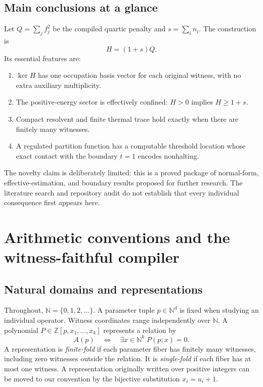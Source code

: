 \documentclass[11pt,letterpaper]{article}
\theoremstyle{definition}
\theoremstyle{remark}
\newcommand{\N}{\mathbb N}
\newcommand{\Z}{\mathbb Z}
\begin{document}
\subsection{Main conclusions at a glance}
Let $Q=\sum_j f_j^2$ be the compiled quartic penalty and $s=\sum_i n_i$. The construction is
\begin{equation}\label{ste:ta:eq:main}
H=(1+s)Q.
\end{equation}
Its essential features are:
\begin{enumerate}[label=(\roman*),itemsep=2pt]
\item $\ker H$ has one occupation basis vector for each original witness, with no extra auxiliary multiplicity.
\item The positive-energy sector is effectively confined: $H>0$ implies $H\ge1+s$.
\item Compact resolvent and finite thermal trace hold exactly when there are finitely many witnesses.
\item A regulated partition function has a computable threshold location whose exact contact with the boundary $t=1$ encodes nonhalting.
\end{enumerate}
The novelty claim is deliberately limited: this is a proved package of normal-form, effective-estimation, and boundary results proposed for further research. The literature search and repository audit do not establish that every individual consequence first appears here.

\section{Arithmetic conventions and the witness-faithful compiler}
\subsection{Natural domains and representations}
Throughout, $\N=\{0,1,2,\ldots\}$. A parameter tuple $p\in\N^d$ is fixed when studying an individual operator. Witness coordinates range independently over $\N$. A polynomial $P\in\Z[p,x_1,\ldots,x_k]$ represents a relation by
\begin{equation}\label{ste:ta:eq:representation}
A(p)\quad\Longleftrightarrow\quad
\exists x\in\N^k\; P(p;x)=0.
\end{equation}
A representation is \emph{finite-fold} if each parameter fiber has finitely many witnesses, including zero witnesses outside the relation. It is \emph{single-fold} if each fiber has at most one witness. A representation originally written over positive integers can be moved to our convention by the bijective substitution $x_i=u_i+1$.
\end{document}
